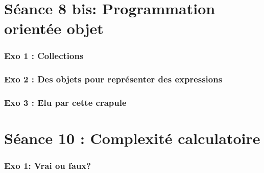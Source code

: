 \part{Séance 8 bis: Programmation orientée objet}
\section{Exo 1 : Collections}


\section{Exo 2 : Des objets pour représenter des expressions}


\section{Exo 3 : Elu par cette crapule}




\part{Séance 10 : Complexité calculatoire}
\section{Exo 1: Vrai ou faux?}







